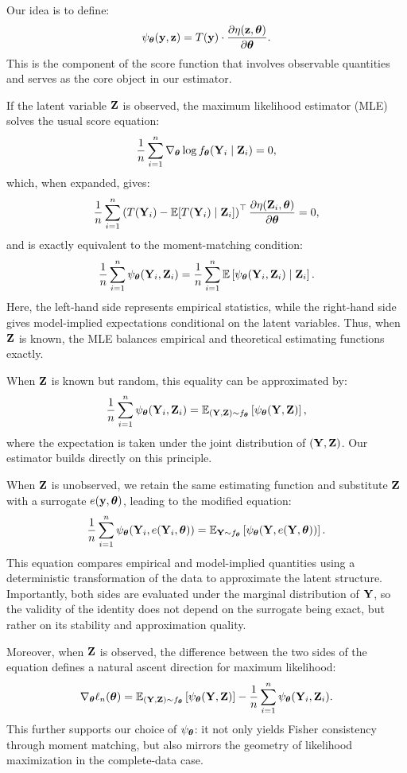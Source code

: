 \documentclass[twoside,11pt]{article}
\begin{document}
Our idea is to define:
\[
\psi_{\bm{\theta}}({\bf y}, {\bf z}) = T({\bf y}) \cdot \frac{\partial \eta({\bf z}, {\bm{\theta}})}{\partial {\bm{\theta}}}.
\]
This is the component of the score function that involves observable quantities and serves as the core object in our estimator.

If the latent variable \({\bf Z}\) is observed, the maximum likelihood estimator (MLE) solves the usual score equation:
\[
\frac{1}{n} \sum_{i=1}^n \nabla_{\bm{\theta}} \log f_{\bm{\theta}}({\bf Y}_i \mid {\bf Z}_i) = 0,
\]
which, when expanded, gives:
\[
\frac{1}{n} \sum_{i=1}^n \left( T({\bf Y}_i) - \mathbb{E}[T({\bf Y}_i) \mid {\bf Z}_i] \right)^\top \frac{\partial \eta({\bf Z}_i, {\bm{\theta}})}{\partial {\bm{\theta}}} = 0,
\]
and is exactly equivalent to the moment-matching condition:
\[
\frac{1}{n} \sum_{i=1}^n \psi_{\bm{\theta}}({\bf Y}_i, {\bf Z}_i)
=
\frac{1}{n} \sum_{i=1}^n \mathbb{E}\left[ \psi_{\bm{\theta}}({\bf Y}_i, {\bf Z}_i) \mid {\bf Z}_i \right].
\]
Here, the left-hand side represents empirical statistics, while the right-hand side gives model-implied expectations conditional on the latent variables. Thus, when \({\bf Z}\) is known, the MLE balances empirical and theoretical estimating functions exactly.

When \({\bf Z}\) is known but random, this equality can be approximated by:
\[
\frac{1}{n} \sum_{i=1}^n \psi_{\bm{\theta}}({\bf Y}_i, {\bf Z}_i)
= \mathbb{E}_{({\bf Y}, {\bf Z}) \sim f_{\bm{\theta}}}\left[ \psi_{\bm{\theta}}({\bf Y}, {\bf Z}) \right],
\]
where the expectation is taken under the joint distribution of \(({\bf Y}, {\bf Z})\). Our estimator builds directly on this principle.

When \({\bf Z}\) is unobserved, we retain the same estimating function and substitute \({\bf Z}\) with a surrogate \( e({\bf y}, {\bm{\theta}}) \), leading to the modified equation:
\[
\frac{1}{n} \sum_{i=1}^n \psi_{\bm{\theta}}({\bf Y}_i, e({\bf Y}_i, {\bm{\theta}})) 
=
\mathbb{E}_{{\bf Y} \sim f_{\bm{\theta}}} \left[ \psi_{\bm{\theta}}({\bf Y}, e({\bf Y}, {\bm{\theta}})) \right].
\]
This equation compares empirical and model-implied quantities using a deterministic transformation of the data to approximate the latent structure. Importantly, both sides are evaluated under the marginal distribution of \({\bf Y}\), so the validity of the identity does not depend on the surrogate being exact, but rather on its stability and approximation quality.

Moreover, when \({\bf Z}\) is observed, the difference between the two sides of the equation defines a natural ascent direction for maximum likelihood:
\[
\nabla_{\bm{\theta}} \ell_n({\bm{\theta}}) 
= 
\mathbb{E}_{({\bf Y}, {\bf Z}) \sim f_{\bm{\theta}}} \left[ \psi_{\bm{\theta}}({\bf Y}, {\bf Z}) \right] 
- 
\frac{1}{n} \sum_{i=1}^n \psi_{\bm{\theta}}({\bf Y}_i, {\bf Z}_i).
\]
This further supports our choice of \(\psi_{\bm{\theta}}\): it not only yields Fisher consistency through moment matching, but also mirrors the geometry of likelihood maximization in the complete-data case.
\end{document}
